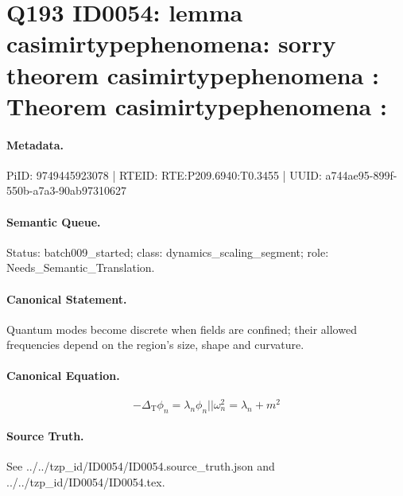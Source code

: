 \section*{Q193 ID0054: lemma casimirtypephenomena: sorry theorem casimirtypephenomena : Theorem casimirtypephenomena :}
\paragraph{Metadata.}
PiID: 9749445923078 | RTEID: RTE:P209.6940:T0.3455 | UUID: a744ae95-899f-550b-a7a3-90ab97310627

\paragraph{Semantic Queue.}
Status: batch009\_started; class: dynamics\_scaling\_segment; role: Needs\_Semantic\_Translation.

\paragraph{Canonical Statement.}
Quantum modes become discrete when fields are confined; their allowed frequencies depend on the region's size, shape and curvature.

\paragraph{Canonical Equation.}
\[
-\Delta_{\mathrm{T}}\phi_{n} = \lambda_{n}\phi_{n} || \omega_{n}^{2} = \lambda_{n} + m^{2}
\]

\paragraph{Source Truth.}
See ../../tzp\_id/ID0054/ID0054.source\_truth.json and ../../tzp\_id/ID0054/ID0054.tex.
